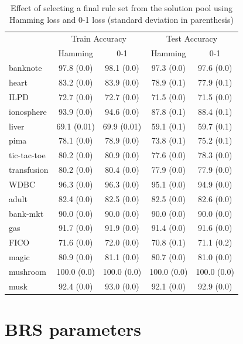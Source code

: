 \documentclass[twoside,11pt]{article}
\begin{document}
\begin{table}[ht]
\centering\footnotesize
\caption{\label{tab:0-1select} Effect of selecting a final rule set from the solution pool using Hamming loss and 0-1 loss (standard deviation in parenthesis) }
\setlength{\tabcolsep}{5pt} %
\begin{tabular}{l c c c c }		\toprule
& \multicolumn{2}{c}{Train Accuracy} & \multicolumn{2}{c}{Test Accuracy} \\
 &Hamming & 0-1 & Hamming & 0-1\\\midrule
banknote & 97.8 (0.0) & 98.1 (0.0) & 97.3 (0.0) & 97.6 (0.0) \\
heart & 83.2 (0.0) & 83.9 (0.0) & 78.9 (0.1) & 77.9 (0.1) \\
ILPD & 72.7 (0.0) & 72.7 (0.0) & 71.5 (0.0) & 71.5 (0.0) \\
ionosphere & 93.9 (0.0) & 94.6 (0.0) & 87.8 (0.1) & 88.4 (0.1) \\
liver &  69.1 (0.01)&  69.9 (0.01) &  59.1 (0.1) &  59.7 (0.1)\\
pima & 78.1 (0.0) & 78.9 (0.0) & 73.8 (0.1) & 75.2 (0.1) \\
tic-tac-toe & 80.2 (0.0) & 80.9 (0.0) & 77.6 (0.0) & 78.3 (0.0) \\
transfusion & 80.2 (0.0) & 80.4 (0.0) & 77.9 (0.0) & 77.9 (0.0) \\
WDBC & 96.3 (0.0) & 96.3 (0.0) & 95.1 (0.0) & 94.9 (0.0) \\ \midrule
adult & 82.4 (0.0) & 82.5 (0.0) & 82.5 (0.0) & 82.6 (0.0) \\
bank-mkt & 90.0 (0.0) & 90.0 (0.0) & 90.0 (0.0) & 90.0 (0.0) \\
gas & 91.7 (0.0) & 91.9 (0.0) & 91.4 (0.0) & 91.6 (0.0) \\
FICO &  71.6 (0.0) &  72.0 (0.0) &  70.8 (0.1)&  71.1 (0.2)\\ 
magic & 80.9 (0.0) & 81.1 (0.0) & 80.7 (0.0) & 81.0 (0.0) \\
mushroom & 100.0 (0.0) & 100.0 (0.0) & 100.0 (0.0) & 100.0 (0.0) \\
musk & 92.4 (0.0) & 93.0 (0.0) & 92.1 (0.0) & 92.9 (0.0) \\
\bottomrule
\end{tabular}%
\end{table}%


\section{BRS parameters} \label{app:brs_params}
\end{document}
